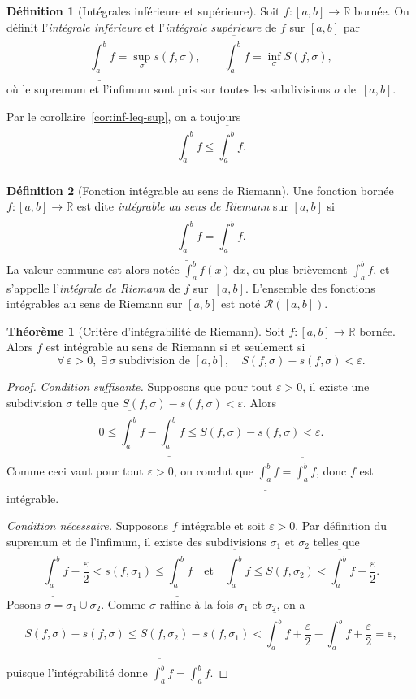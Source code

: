 \documentclass[12pt,a4paper,openany]{book}
\theoremstyle{definition}
\newtheorem{definition}{Définition}[chapter]
\newtheorem{theoreme}{Théorème}[chapter]
\newcommand{\R}{\mathbb{R}}
\newcommand{\eps}{\varepsilon}
\newcommand{\dd}{\mathrm{d}}
\begin{document}
\begin{definition}[Intégrales inférieure et supérieure]\label{def:int-inf-sup}
  Soit $f \colon [a,b] \to \R$ bornée. On définit l'\emph{intégrale inférieure} et l'\emph{intégrale supérieure} de $f$ sur $[a,b]$ par
  \[
    \underline{\int_a^b} f = \sup_{\sigma} s(f, \sigma), \qquad
    \overline{\int_a^b} f = \inf_{\sigma} S(f, \sigma),
  \]
  où le supremum et l'infimum sont pris sur toutes les subdivisions $\sigma$ de~$[a,b]$.
\end{definition}

Par le corollaire~\ref{cor:inf-leq-sup}, on a toujours
\[
  \underline{\int_a^b} f \leqslant \overline{\int_a^b} f.
\]

\begin{definition}[Fonction intégrable au sens de Riemann]\label{def:integrabilite-riemann}
  Une fonction bornée $f \colon [a,b] \to \R$ est dite \emph{intégrable au sens de Riemann} sur $[a,b]$ si
  \[
    \underline{\int_a^b} f = \overline{\int_a^b} f.
  \]
  La valeur commune est alors notée $\displaystyle\int_a^b f(x)\,\dd x$, ou plus brièvement $\displaystyle\int_a^b f$, et s'appelle l'\emph{intégrale de Riemann} de $f$ sur~$[a,b]$. L'ensemble des fonctions intégrables au sens de Riemann sur $[a,b]$ est noté $\mathcal{R}([a,b])$.
\end{definition}

\begin{theoreme}[Critère d'intégrabilité de Riemann]\label{thm:critere-integrabilite}
  Soit $f \colon [a,b] \to \R$ bornée. Alors $f$ est intégrable au sens de Riemann si et seulement si
  \[
    \forall\, \eps > 0,\; \exists\, \sigma \text{ subdivision de } [a,b], \quad S(f,\sigma) - s(f,\sigma) < \eps.
  \]
\end{theoreme}

\begin{proof}
  \emph{Condition suffisante.} Supposons que pour tout $\eps > 0$, il existe une subdivision $\sigma$ telle que $S(f,\sigma) - s(f,\sigma) < \eps$. Alors
  \[
    0 \leqslant \overline{\int_a^b} f - \underline{\int_a^b} f
    \leqslant S(f,\sigma) - s(f,\sigma) < \eps.
  \]
  Comme ceci vaut pour tout $\eps > 0$, on conclut que $\displaystyle\underline{\int_a^b} f = \overline{\int_a^b} f$, donc $f$ est intégrable.

  \emph{Condition nécessaire.} Supposons $f$ intégrable et soit $\eps > 0$. Par définition du supremum et de l'infimum, il existe des subdivisions $\sigma_1$ et $\sigma_2$ telles que
  \[
    \underline{\int_a^b} f - \frac{\eps}{2} < s(f, \sigma_1) \leqslant \underline{\int_a^b} f
    \quad \text{et} \quad
    \overline{\int_a^b} f \leqslant S(f, \sigma_2) < \overline{\int_a^b} f + \frac{\eps}{2}.
  \]
  Posons $\sigma = \sigma_1 \cup \sigma_2$. Comme $\sigma$ raffine à la fois $\sigma_1$ et $\sigma_2$, on a
  \[
    S(f, \sigma) - s(f, \sigma) \leqslant S(f, \sigma_2) - s(f, \sigma_1)
    < \overline{\int_a^b} f + \frac{\eps}{2} - \underline{\int_a^b} f + \frac{\eps}{2}
    = \eps,
  \]
  puisque l'intégrabilité donne $\displaystyle\overline{\int_a^b} f = \underline{\int_a^b} f$.
\end{proof}
\end{document}
